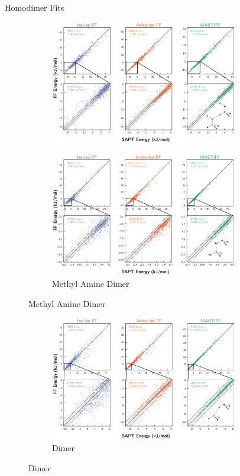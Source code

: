 \begin{section}{Homodimer Fits}
\begin{figure}
\begin{subfigure}{\textwidth}
        \includegraphics[width=0.9\textwidth]{anisotropic/si/homodimer_figures/methanol_methanol_comparison.pdf}
    \end{subfigure}
    \begin{subfigure}{\textwidth}
        \caption{Methyl Amine Dimer}
        \includegraphics[width=0.9\textwidth]{anisotropic/si/homodimer_figures/methyl_amine_methyl_amine_comparison.pdf}
    \end{subfigure}
    \end{figure}
    \begin{figure}
    \ContinuedFloat
    \begin{subfigure}{\textwidth}
        \caption{\nh Dimer}
        \includegraphics[width=0.9\textwidth]{anisotropic/si/homodimer_figures/nh3_nh3_comparison.pdf}

\end{subfigure}
\end{figure}
\end{section}
